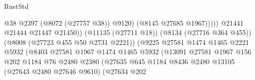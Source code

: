 \begin{lexlean}{RustStd}
\begin{coremodule}
                                                              @38
                                                              @2397
                                                              (@8072 (@27757 @38))
                                                              @9120)
                                                            (@8145 @27685 @1967)))))
                                                    @21441
                                                    @21444
                                                    @21447
                                                    @21450))
                                                (@11135 (@27711 @18))
                                                (@8134 (@27716 @364 @455))
                                                (@8008 (@27723 @455 @50 @2731 @2221))
                                                (@9225
                                                  @27581
                                                  @1474
                                                  @1465
                                                  @2221
                                                  @5932
                                                  (@8403
                                                    @27581
                                                    @1967
                                                    @1474
                                                    @1465
                                                    @5932
                                                    (@13091
                                                      @27581
                                                      @1967
                                                      @156
                                                      @202
                                                      @1184
                                                      @76
                                                      @2480
                                                      @2380
                                                      (@27635
                                                        @645
                                                        @1184
                                                        @8436
                                                        @2480
                                                        @13105
                                                        (@27643 @2480 @27646 @9610)
                                                        (@27634
                                                          @202

\end{coremodule}
\end{lexlean}
